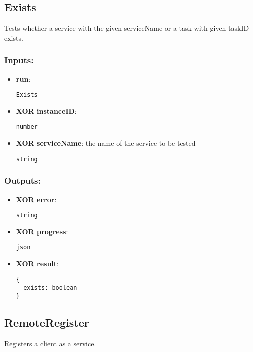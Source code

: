 \subsection{Exists}
\label{ch:builtinservices:Exists}
Tests whether a service with the given serviceName or a task with given taskID exists.
\subsubsection*{Inputs:}
\begin{itemize}
    \item \textbf{run}: 
\begin{lstlisting}
Exists
\end{lstlisting}
    \item \textbf{XOR instanceID}: 
\begin{lstlisting}
number
\end{lstlisting}
    \item \textbf{XOR serviceName}: the name of the service to be tested
\begin{lstlisting}
string
\end{lstlisting}
  \end{itemize}

\subsubsection*{Outputs:}
\begin{itemize}
    \item \textbf{XOR error}: 
\begin{lstlisting}
string
\end{lstlisting}
    \item \textbf{XOR progress}: 
\begin{lstlisting}
json
\end{lstlisting}
    \item \textbf{XOR result}: 
\begin{lstlisting}
{
  exists: boolean
}
\end{lstlisting}
  \end{itemize}

\subsection{RemoteRegister}
\label{ch:builtinservices:RemoteRegister}
Registers a client as a service.
